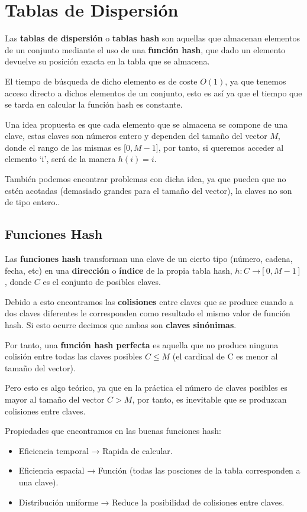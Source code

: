\chapter{Tablas de Dispersión}
Las \textbf{tablas de dispersión} o \textbf{tablas hash} son aquellas que almacenan elementos de un conjunto mediante el uso de una \textbf{función hash}, que dado un elemento devuelve su posición exacta en la tabla que se almacena.

El tiempo de búsqueda de dicho elemento es de coste \(O(1)\), ya que tenemos acceso directo a dichos elementos de un conjunto, esto es así ya que el tiempo que se tarda en calcular la función hash es constante.


Una idea propuesta es que cada elemento que se almacena se compone de una clave, estas claves son números entero y dependen del tamaño del vector \(M\), donde el rango de las mismas es [\(0, M-1\)], por tanto, si queremos acceder al elemento `i', será de la manera \(h(i) = i\).

También podemos encontrar problemas con dicha idea, ya que pueden que no estén acotadas (demasiado grandes para el tamaño del vector), la claves no son de tipo entero..

\section{Funciones Hash}
Las \textbf{funciones hash} transforman una clave de un cierto tipo (número, cadena, fecha, etc) en una \textbf{dirección} o \textbf{índice} de la propia tabla hash, \(h: C\) →\([0, M-1]\), donde \(C\) es el conjunto de posibles claves.

Debido a esto encontramos las \textbf{colisiones} entre claves que se produce cuando a dos claves diferentes le corresponden como resultado el mismo valor de función hash. Si esto ocurre decimos que ambas son \textbf{claves sinónimas}.

Por tanto, una \textbf{función hash perfecta} es aquella que no produce ninguna colisión entre todas las claves posibles \(C \leq M\) (el cardinal de C es menor al tamaño del vector).

Pero esto es algo teórico, ya que en la práctica el número de claves posibles es mayor al tamaño del vector \(C > M\), por tanto, es inevitable que se produzcan colisiones entre claves.

Propiedades que encontramos en las buenas funciones hash:
\begin{itemize}
  \item Eficiencia temporal → Rapida de calcular.
  \item Eficiencia espacial → Función (todas las posciones de la tabla corresponden a una clave).
  \item Distribución uniforme → Reduce la posibilidad de colisiones entre claves.
\end{itemize}

